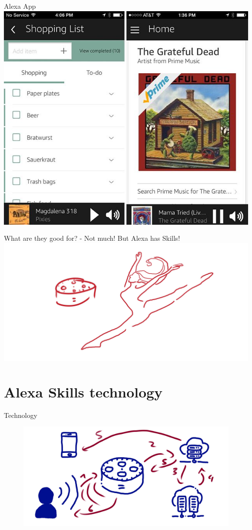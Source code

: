 \documentclass[aspectratio=169]{beamer}
\begin{document}
     \begin{frame}{Alexa App}
     	\centering
     	\includegraphics[width=.55\textwidth]{images/Side-by-side1}
     	
     	\tiny{\color{gray}{https://cdn.thewirecutter.com/wp-content/uploads/2016/08/Side-by-side1.jpg}}
     \end{frame}
 
 \begin{frame}{What are they good for? - Not much!}
 \centering
 	 	But Alexa has Skills!
 	 	\includegraphics[width=0.8\linewidth]{images/alexadance}
\end{frame}

\section{Alexa Skills technology}
\begin{frame}{Technology}
	\begin{figure}
		\includegraphics[width=1\linewidth]{images/alexatech}
	\end{figure}
\end{frame}
\end{document}
